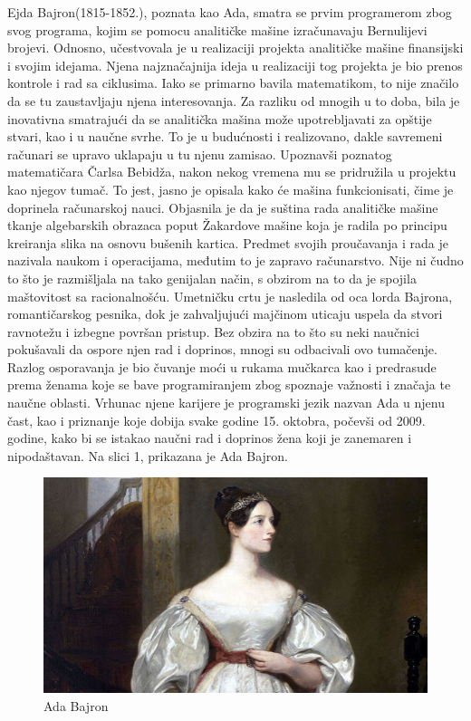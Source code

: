 \documentclass[a4paper,12pt]{article}
\begin{document}
\begin{flushleft}
    Ejda Bajron(1815-1852.), poznata kao Ada, smatra se prvim programerom zbog svog programa, kojim se pomocu analitičke mašine izračunavaju Bernulijevi brojevi. Odnosno, učestvovala je u realizaciji projekta analitičke mašine finansijski i svojim idejama. Njena najznačajnija ideja u realizaciji tog projekta je bio prenos kontrole i rad sa ciklusima. Iako se primarno bavila matematikom, to nije značilo da se tu zaustavljaju njena interesovanja. Za razliku od mnogih u to doba, bila je inovativna smatrajući da se analitička mašina može upotrebljavati za opštije stvari, kao i u naučne svrhe. To je u budućnosti i realizovano, dakle savremeni računari se upravo uklapaju u tu njenu zamisao. Upoznavši poznatog matematičara Čarlsa Bebidža, nakon nekog vremena mu se pridružila u projektu kao njegov tumač. To jest, jasno je opisala kako će mašina funkcionisati, čime je doprinela računarskoj nauci. Objasnila je da je suština rada analitičke mašine tkanje algebarskih obrazaca poput Žakardove mašine koja je radila po principu kreiranja slika na osnovu bušenih kartica. Predmet svojih proučavanja i rada je nazivala naukom i operacijama, međutim to je zapravo računarstvo. Nije ni čudno to što je razmišljala na tako genijalan način, s obzirom na to da je spojila maštovitost sa racionalnošću. Umetničku crtu je nasledila od oca lorda Bajrona, romantičarskog pesnika, dok je zahvaljujući majčinom uticaju uspela da stvori ravnotežu i izbegne površan pristup. Bez obzira na to što su neki naučnici pokušavali da ospore njen rad i doprinos, mnogi su odbacivali ovo tumačenje. Razlog osporavanja je bio čuvanje moći u rukama mučkarca kao i predrasude prema ženama koje se bave programiranjem zbog spoznaje važnosti i značaja te naučne oblasti. Vrhunac njene karijere je programski jezik nazvan Ada u njenu čast, kao i priznanje koje dobija svake godine 15. oktobra, počevši od 2009. godine, kako bi se istakao naučni rad i doprinos žena koji je zanemaren i nipodaštavan. Na slici 1, prikazana je Ada Bajron.
\end{flushleft}

\begin{figure}[h]
    \centering
    \includegraphics[width = .6\textwidth]{adabajron.jpg}
    \caption{Ada Bajron}
    \label{fig:my_label}
\end{figure}
\end{document}

